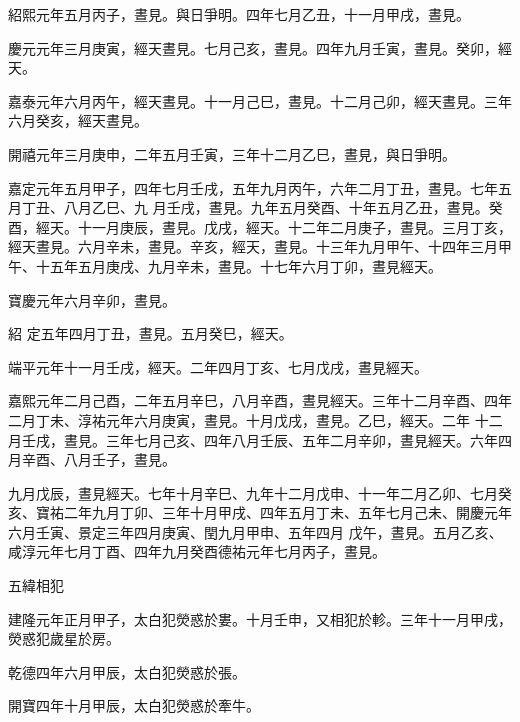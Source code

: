 \begin{pinyinscope}
 紹熙元年五月丙子，晝見。與日爭明。四年七月乙丑，十一月甲戌，晝見。



 慶元元年三月庚寅，經天晝見。七月己亥，晝見。四年九月壬寅，晝見。癸卯，經天。



 嘉泰元年六月丙午，經天晝見。十一月己巳，晝見。十二月己卯，經天晝見。三年六月癸亥，經天晝見。



 開禧元年三月庚申，二年五月壬寅，三年十二月乙巳，晝見，與日爭明。



 嘉定元年五月甲子，四年七月壬戌，五年九月丙午，六年二月丁丑，晝見。七年五月丁丑、八月乙巳、九
 月壬戌，晝見。九年五月癸酉、十年五月乙丑，晝見。癸酉，經天。十一月庚辰，晝見。戊戌，經天。十二年二月庚子，晝見。三月丁亥，經天晝見。六月辛未，晝見。辛亥，經天，晝見。十三年九月甲午、十四年三月甲午、十五年五月庚戌、九月辛未，晝見。十七年六月丁卯，晝見經天。



 寶慶元年六月辛卯，晝見。



 紹
 定五年四月丁丑，晝見。五月癸巳，經天。



 端平元年十一月壬戌，經天。二年四月丁亥、七月戊戌，晝見經天。



 嘉熙元年二月己酉，二年五月辛巳，八月辛酉，晝見經天。三年十二月辛酉、四年二月丁未、淳祐元年六月庚寅，晝見。十月戊戌，晝見。乙巳，經天。二年
 十二月壬戌，晝見。三年七月己亥、四年八月壬辰、五年二月辛卯，晝見經天。六年四月辛酉、八月壬子，晝見。



 九月戊辰，晝見經天。七年十月辛巳、九年十二月戊申、十一年二月乙卯、七月癸亥、寶祐二年九月丁卯、三年十月甲戌、四年五月丁未、五年七月己未、開慶元年六月壬寅、景定三年四月庚寅、閏九月甲申、五年四月
 戊午，晝見。五月乙亥、咸淳元年七月丁酉、四年九月癸酉德祐元年七月丙子，晝見。



 五緯相犯



 建隆元年正月甲子，太白犯熒惑於婁。十月壬申，又相犯於軫。三年十一月甲戌，熒惑犯歲星於房。



 乾德四年六月甲辰，太白犯熒惑於張。



 開寶四年十月甲辰，太白犯熒惑於牽牛。




\end{pinyinscope}
